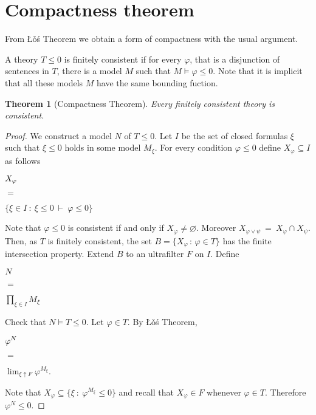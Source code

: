 \documentclass[12pt,letterpaper,oneside,reqno]{amsart}
\theoremstyle{plain}
\newtheorem{theorem}{Theorem}%
\theoremstyle{remark}
\begin{document}
\section{Compactness theorem}\label{compactness}

\def\ceq#1#2#3{\parbox[t]{20ex}{$\displaystyle #1$}\parbox{5ex}{\hfil $#2$}{$\displaystyle #3$}}

From \L\v{o}\'s Theorem we obtain a form of compactness with the usual argument.

A theory $T\le0$ is finitely consistent if for every $\varphi$, that is a disjunction of sentences in $T$, there is a model $M$ such that $M\models \varphi\le0$.
Note that it is implicit that all these models $M$ have the same bounding fuction.

\begin{theorem}[Compactness Theorem]\label{thm_compattezza}
  Every finitely consistent theory is consistent. 
  \end{theorem}
  
  \begin{proof}
  We construct a model $N$ of $T\le0$.
  Let $I$ be the set of closed formulas $\xi$ such that $\xi\le0$ holds in some model $M_\xi$.
  For every condition $\varphi\le0$ define $X_\varphi\subseteq I$ as follows
  
  \ceq{\hfill X_\varphi}{=}{\Big\{\xi\in I\ :\ \xi\le0\ \vdash\ \varphi\le0\Big\}}
  
  Note that $\varphi\le0$ is consistent if and only if $X_\varphi\neq\varnothing$.
  Moreover $X_{\varphi\vee\psi}\ =\ X_\varphi\cap X_\psi$. Then, as $T$  is finitely consistent, the set $B=\big\{X_\varphi\,:\,\varphi\in T\big\}$ has the finite intersection property.
  Extend $B$ to an ultrafilter $F$ on $I$.
  Define
  
  \ceq{\hfill N}{=}{\prod_{\xi\in I}M_\xi}
  
  Check that $N\models T\le0$. Let $\varphi\in T$. By \L\v{o}\'s Theorem,
  
  \ceq{\hfill \varphi^N}%
  {=}%
  {\lim_{\xi\uparrow F}\varphi^{M_\xi}.}
  
  Note that $X_\varphi\subseteq \big\{\xi\ :\ \varphi^{M_\xi}\le0\big\}$ and recall that $X_\varphi\in F$ whenever $\varphi\in T$.
  Therefore $\varphi^N\le0$.
  \end{proof}
\end{document}

